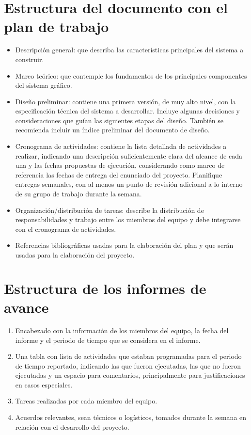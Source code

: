 \documentclass[12pt,letterpaper]{article}
\begin{document}
\section*{Estructura del documento con el plan de trabajo}

 \begin{itemize}
 \item Descripción general: que describa las características principales del sistema a construir.
 \item Marco teórico: que contemple los fundamentos de los principales componentes del sistema gráfico.
 \item Diseño preliminar: contiene una primera versión, de muy alto nivel, con la especificación técnica del sistema a desarrollar. Incluye algunas decisiones y consideraciones que guían las siguientes etapas del diseño. También se recomienda incluir un índice preliminar del documento de diseño.
 \item Cronograma de actividades: contiene la lista detallada de actividades a realizar, indicando una descripción suficientemente clara del alcance de cada una y las fechas propuestas de ejecución, considerando como marco de referencia las fechas de entrega del enunciado del proyecto. Planifique entregas semanales, con al menos un punto de revisión adicional a lo interno de su grupo de trabajo durante la semana.
 \item Organización/distribución de tareas: describe la distribución de responsabilidades y trabajo entre los miembros del equipo y debe integrarse con el cronograma de actividades.  
 \item Referencias bibliográficas usadas para la elaboración del plan y que serán usadas para la elaboración del proyecto.
 \end{itemize}

\section*{Estructura de los informes de avance}

 \begin{enumerate}
 \item Encabezado con la información de los miembros del equipo, la fecha del informe y el periodo de tiempo que se considera en el informe.
 \item Una tabla con lista de actividades que estaban programadas para el periodo de tiempo reportado, indicando las que fueron ejecutadas, las que no fueron ejecutadas y un espacio para comentarios, principalmente para justificaciones en casos especiales.
 \item Tareas realizadas por cada miembro del equipo.
 \item Acuerdos relevantes, sean técnicos o logísticos, tomados durante la semana en relación con el desarrollo del proyecto.
 \end{enumerate}
\end{document}
